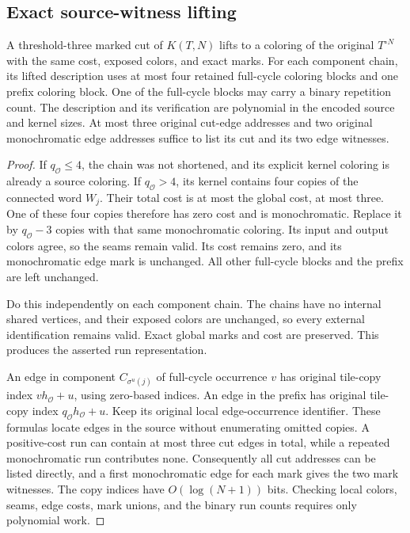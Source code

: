 \subsection{Exact source-witness lifting}

\begin{theorem}
\label{thm:route-lift}
A threshold-three marked cut of $K(T,N)$ lifts to a coloring of the original
$T^{\circ N}$ with the same cost, exposed colors, and exact marks.
For each component chain, its lifted description uses at most four retained
full-cycle coloring blocks and one prefix coloring block.  One of the
full-cycle blocks may carry a binary repetition count.  The description and
its verification are polynomial in the encoded source and kernel sizes.
At most three original cut-edge addresses and two original monochromatic
edge addresses suffice to list its cut and its two edge witnesses.
\end{theorem}

\begin{proof}
If $q_{\mathcal O}\leq4$, the chain was not shortened, and its explicit
kernel coloring is already a source coloring.  If $q_{\mathcal O}>4$,
its kernel contains four copies of the connected word $W_j$.  Their total
cost is at most the global cost, at most three.  One of these four copies
therefore has zero cost and is monochromatic.  Replace it by
$q_{\mathcal O}-3$ copies with that same monochromatic coloring.  Its
input and output colors agree, so the seams remain valid.  Its cost remains
zero, and its monochromatic edge mark is unchanged.  All other full-cycle
blocks and the prefix are left unchanged.

Do this independently on each component chain.  The chains have no internal
shared vertices, and their exposed colors are unchanged, so every external
identification remains valid.  Exact global marks and cost are preserved.
This produces the asserted run representation.

An edge in component $C_{\sigma^u(j)}$ of full-cycle occurrence $v$ has
original tile-copy index $vh_{\mathcal O}+u$, using zero-based indices.
An edge in the prefix has original tile-copy index
$q_{\mathcal O}h_{\mathcal O}+u$.  Keep its original local edge-occurrence
identifier.  These formulas locate edges in the source without enumerating
omitted copies.  A positive-cost run can contain at most three cut edges
in total, while a repeated monochromatic run contributes none.  Consequently
all cut addresses can be listed directly, and a first monochromatic edge
for each mark gives the two mark witnesses.  The copy indices have
$O(\log(N+1))$ bits.  Checking local colors, seams, edge costs, mark unions,
and the binary run counts requires only polynomial work.
\end{proof}

